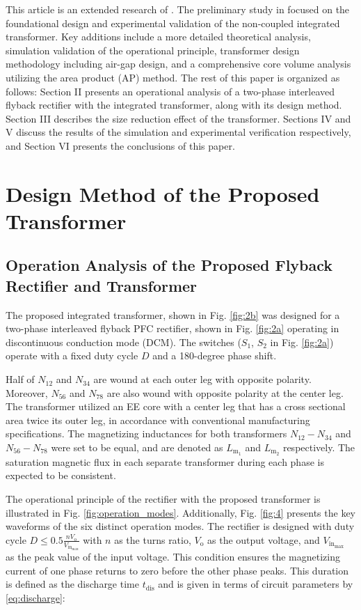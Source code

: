 \documentclass[lettersize,journal]{IEEEtran}
\begin{document}
This article is an extended research of \cite{ECCE}. The preliminary study in \cite{ECCE} focused on the foundational design and experimental validation of the non-coupled integrated transformer. Key additions include a more detailed theoretical analysis, simulation validation of the operational principle, transformer design methodology including air-gap design, and a comprehensive core volume analysis utilizing the area product (AP) method. The rest of this paper is organized as follows: Section II presents an operational analysis of a two-phase interleaved flyback rectifier with the integrated transformer, along with its design method. Section III describes the size reduction effect of the transformer. Sections IV and V discuss the results of the simulation and experimental verification respectively, and Section VI presents the conclusions of this paper.

\section{Design Method of the Proposed Transformer}

\subsection{Operation Analysis of the Proposed Flyback Rectifier and Transformer}
The proposed integrated transformer, shown in Fig. \ref{fig:2b} was designed for a two-phase interleaved flyback PFC rectifier, shown in Fig. \ref{fig:2a} operating in discontinuous conduction mode (DCM). The switches ($S_1$, $S_2$ in Fig. \ref{fig:2a}) operate with a fixed duty cycle $D$ and a 180-degree phase shift.

Half of $N_{12}$ and $N_{34}$ are wound at each outer leg with opposite polarity. Moreover, $N_{56}$ and $N_{78}$ are also wound with opposite polarity at the center leg. The transformer utilized an EE core with a center leg that has a cross sectional area twice its outer leg, in accordance with conventional manufacturing specifications. The magnetizing inductances for both transformers $N_{12}-N_{34}$ and $N_{56}-N_{78}$ were set to be equal, and are denoted as $L_{\mathrm{m}_1}$ and $L_{\mathrm{m}_2}$ respectively. The saturation magnetic flux in each separate transformer during each phase is expected to be consistent.

The operational principle of the rectifier with the proposed transformer is illustrated in Fig. \ref{fig:operation_modes}. Additionally, Fig. \ref{fig:4} presents the key waveforms of the six distinct operation modes. The rectifier is designed with duty cycle $D \le 0.5 \frac{n V_{\mathrm{o}}}{V_{\mathrm{in}_{\mathrm{max}}}}$ with $n$ as the turns ratio, $V_{\mathrm{o}}$ as the output voltage, and $V_{\mathrm{in}_{\mathrm{max}}}$ as the peak value of the input voltage. This condition ensures the magnetizing current of one phase returns to zero before the other phase peaks. This duration is defined as the discharge time $t_{\mathrm{dis}}$ and is given in terms of circuit parameters by \eqref{eq:discharge}:
\end{document}
